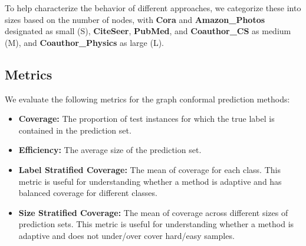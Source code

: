 To help characterize the behavior of different approaches, we categorize these into sizes based on the number of nodes, with \textbf{Cora} and \textbf{Amazon\_Photos} designated as small (S), \textbf{CiteSeer}, \textbf{PubMed}, and \textbf{Coauthor\_CS} as medium (M), and \textbf{Coauthor\_Physics} as large (L).

\subsection{Metrics}
We evaluate the following metrics for the graph conformal prediction methods:
\begin{itemize}
    \item \textbf{Coverage:} The proportion of test instances for which the true label is contained in the prediction set.
    \item \textbf{Efficiency:} The average size of the prediction set.
    \item \textbf{Label Stratified Coverage:} The mean of coverage for each class. This metric is useful for understanding whether a method is adaptive and has balanced coverage for different classes.
    \item \textbf{Size Stratified Coverage:} The mean of coverage across different sizes of prediction sets. This metric is useful for understanding whether a method is adaptive and does not under/over cover hard/easy samples.
\end{itemize}

